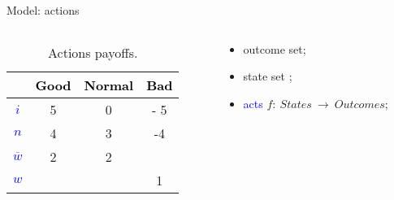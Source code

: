 \documentclass[usenames,dvipsnames,aspectratio=169,11pt, envcountsect, handout]{beamer}
\begin{document}
\begin{frame}[noframenumbering]{Model: actions}

	\begin{columns}
		\begin{column}{0.45\textwidth}  %
			\begin{center}
				\begin{table}[H]
					\centering
					\begin{tabular}{c | c c c}
						                                     & \textcolor{black}{Good} & \textcolor{black}{Normal} & \textcolor{black}{Bad} \\
						\hline
						\textcolor{blue}{\( i \)}            & 5                       & 0                         & - 5                    \\
						\textcolor{blue}{\( n \)}            & 4                       & 3                         & -4                     \\
						\textcolor{blue}{\( \overline{w} \)} & 2                       & 2                         &                        \\
						\textcolor{blue}{\( w \)}            &                         &                           & 1                      \\
					\end{tabular}
					\caption{Actions payoffs.}
					\label{tab:actions_inv3}
				\end{table}
			\end{center}
		\end{column}

		\begin{column}{0.55\textwidth}  %
			\begin{itemize}
				\item outcome set;
				\item state set ;
				\item \textcolor{blue}{acts} \( f : \: States \: \rightarrow \: Outcomes \);
			\end{itemize}
		\end{column}
	\end{columns}

\end{frame}
\end{document}
